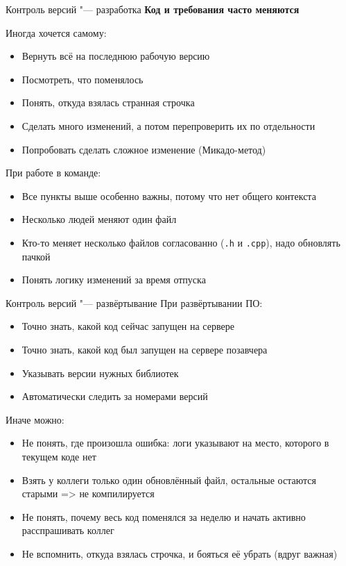 \begin{frame}[t]{Контроль версий "--- разработка}
\textbf{Код и требования часто меняются}

Иногда хочется самому:
\begin{itemize}
\item Вернуть всё на последнюю рабочую версию
\item Посмотреть, что поменялось
\item Понять, откуда взялась странная строчка
\item Сделать много изменений, а потом перепроверить их по отдельности
\item Попробовать сделать сложное изменение (Микадо-метод)
\end{itemize}

При работе в команде:
\begin{itemize}
\item Все пункты выше особенно важны, потому что нет общего контекста
\item Несколько людей меняют один файл
\item Кто-то меняет несколько файлов согласованно (\verb~.h~ и \verb~.cpp~), надо обновлять пачкой
\item Понять логику изменений за время отпуска
\end{itemize}
\end{frame}

\begin{frame}[t]{Контроль версий "--- развёртывание}
При развёртывании ПО:
\begin{itemize}
\item Точно знать, какой код сейчас запущен на сервере
\item Точно знать, какой код был запущен на сервере позавчера
\item Указывать версии нужных библиотек
\item Автоматически следить за номерами версий
\end{itemize}

Иначе можно:
\begin{itemize}
\item Не понять, где произошла ошибка: логи указывают на место, которого в текущем коде нет
\item Взять у коллеги только один обновлённый файл, остальные остаются старыми => не компилируется
\item Не понять, почему весь код поменялся за неделю и начать активно расспрашивать коллег
\item Не вспомнить, откуда взялась строчка, и бояться её убрать (вдруг важная)
\end{itemize}
\end{frame}


